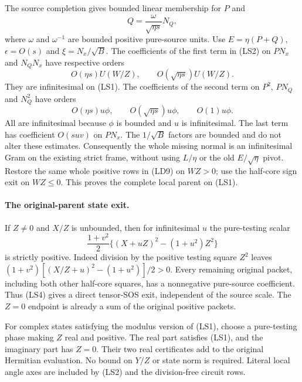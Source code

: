The source completion gives bounded linear membership for $P$ and
\[
 Q=\frac{\omega}{\sqrt{\eta s}}N_Q,
\]
where $\omega$ and $\omega^{-1}$ are bounded positive pure-source
units. Use $E=\eta(P+Q)$, $\epsilon=O(s)$ and
$\xi=N_x/\sqrt B$. The coefficients of the first term in (LS2)
on $PN_x$ and $N_QN_x$ have respective orders
\[
 O(\eta s)U(W/Z),\qquad O(\sqrt{\eta s})U(W/Z).
\]
They are infinitesimal on (LS1). The coefficients of the second term
on $P^2$, $PN_Q$ and $N_Q^2$ have orders
\[
 O(\eta s)u\phi,\qquad
 O(\sqrt{\eta s})u\phi,\qquad O(1)u\phi.             \tag{LS3}
\]
All are infinitesimal because $\phi$ is bounded and $u$ is
infinitesimal. The last term has coefficient $O(suv)$ on $PN_x$.
The $1/\sqrt B$ factors are bounded and do not alter these estimates.
Consequently the whole missing normal is an infinitesimal Gram on
the existing strict frame, without using $L/\eta$ or the old
$E/\sqrt\eta$ pivot. Restore the same whole positive rows in (LD9)
on $WZ>0$; use the half-core sign exit on $WZ\le0$. This proves
the complete local parent on (LS1).

\paragraph{The original-parent state exit.}
If $Z\ne0$ and $X/Z$ is unbounded, then for infinitesimal $u$
the pure-testing scalar
\[
 \frac{1+v^2}{2}
       \big\{(X+uZ)^2-(1+u^2)Z^2\big\}              \tag{LS4}
\]
is strictly positive. Indeed division by the positive testing square
$Z^2$ leaves $(1+v^2)[(X/Z+u)^2-(1+u^2)]/2>0$.
Every remaining original packet, including both other half-core
squares, has a nonnegative pure-source coefficient. Thus (LS4)
gives a direct tensor-SOS exit, independent of the source scale.
The $Z=0$ endpoint is already a sum of the original positive packets.

For complex states satisfying the modulus version of (LS1), choose
a pure-testing phase making $Z$ real and positive. The real part
satisfies (LS1), and the imaginary part has $Z=0$. Their two real
certificates add to the original Hermitian evaluation. No bound on
$Y/Z$ or state norm is required. Literal local angle axes are included
by (LS2) and the division-free circuit rows.

